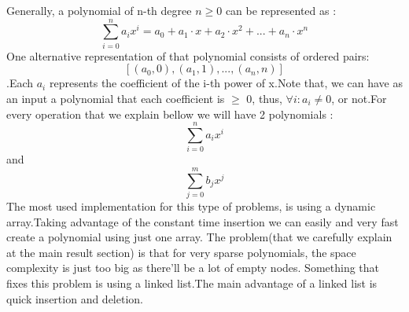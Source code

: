 \documentclass[journal,article,submit,moreauthors,algorithms]{Definitions/mdpi}
\begin{document}
Generally, a polynomial of n-th degree $n \geq 0$ can be represented as : \[\sum_{i=0}^{n} a_ix^i = a_0 + a_1 \cdot x + a_2\cdot x^2 + ... + a_n \cdot x^n\]
One alternative representation of that polynomial consists of ordered pairs: 
\[ [(a_0, 0), (a_1, 1), ..., (a_n, n)]\].Each $a_i$ represents the coefficient of the i-th power of x.Note that, we can have as an input a polynomial that each coefficient is $\geq$ 0, thus, $\forall i : a_i \neq 0$, or not.For every operation that we explain bellow we will have 2 polynomials :\[\sum_{i=0}^{n} a_ix^i\] and \[\sum_{j=0}^{m} b_jx^j\] The most used implementation for this type of problems, is using a dynamic array.Taking advantage of the constant time insertion we can easily and very fast create a polynomial using just one array. The problem(that we carefully explain at the main result section) is that for very sparse polynomials, the space complexity is just too big as there'll be a lot of empty nodes. Something that fixes this problem is using a linked list.The main advantage of a linked list is quick insertion and deletion.
\end{document}
